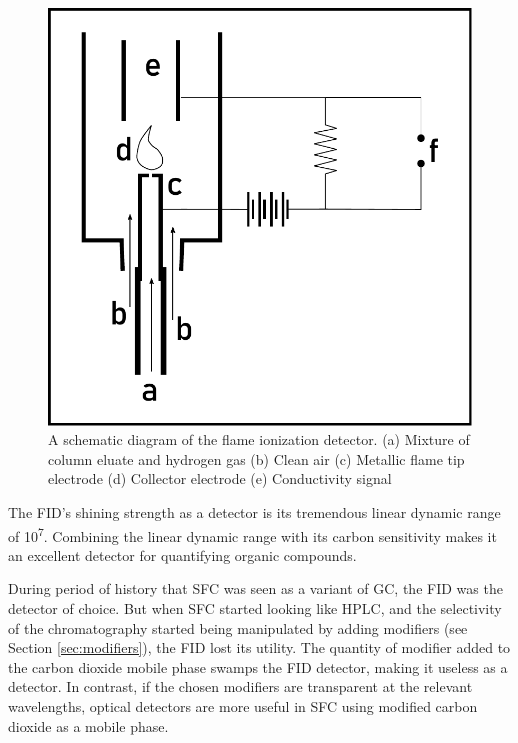 \begin{figure}
\centering
\includegraphics[width=\textwidth]{Figures/FIDSchematic.pdf}
\decoRule

\caption[FID diagram]{A schematic diagram of the flame ionization detector. (a)
Mixture of column eluate and hydrogen gas (b) Clean air (c) Metallic flame tip
electrode (d) Collector electrode (e) Conductivity signal}

\label{fig:fiddiagram}

\end{figure}

The FID's shining strength as a detector is its tremendous linear dynamic range
of 10\textsuperscript{7}. Combining the linear dynamic range with its carbon
sensitivity makes it an excellent detector for quantifying organic compounds.

During period of history that SFC was seen as a variant of GC, the FID was the
detector of choice. But when SFC started looking like HPLC, and the selectivity
of the chromatography started being manipulated by adding modifiers (see Section
\ref{sec:modifiers}), the FID lost its utility. The quantity of modifier added
to the carbon dioxide mobile phase swamps the FID detector, making it useless as
a detector. In contrast, if the chosen modifiers are transparent at the relevant
wavelengths, optical detectors are more useful in SFC using modified carbon
dioxide as a mobile phase.

